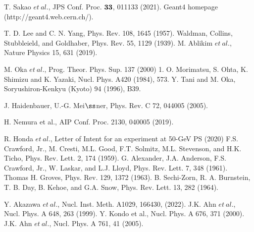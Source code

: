 \begin{thebibliography}{99}
 T. Sakao $et\ al.$, JPS Conf. Proc. $\bf{33}$, 011133 (2021).
Geant4 homepage (http://geant4.web.cern.ch/).



T. D. Lee and C. N. Yang, Phys. Rev. 108, 1645 (1957).
Waldman, Collins, Stubbleield, and Goldhaber, Phys. Rev. 55, 1129 (1939).
M. Ablikim $et\ al.$, Nature Physics 15, 631 (2019).





M. Oka $et\ al.$, Prog. Theor. Phys. Sup. 137 (2000) 1.
O. Morimatsu, S. Ohta, K. Shimizu and K. Yazaki, Nucl. Phys. A420 (1984), 573.
Y. Tani and M. Oka, Soryushiron-Kenkyu (Kyoto) 94 (1996), B39.






J. Haidenbauer, U.-G. Mei$\ss$ner, Phys. Rev. C 72, 044005 (2005).

H. Nemura et al., AIP Conf. Proc. 2130, 040005 (2019).




R. Honda $et\ al.$, Letter of Intent for an experiment at 50-GeV PS (2020)
F.S. Crawford, Jr., M. Cresti, M.L. Good, F.T. Solmitz, M.L. Stevenson, and H.K. Ticho, Phys. Rev. Lett. 2, 174 (1959).
G. Alexander, J.A. Anderson, F.S. Crawford, Jr., W. Laskar, and L.J. Lloyd, Phys. Rev. Lett. 7, 348 (1961).
Thomas H. Groves, Phys. Rev. 129, 1372 (1963).
B. Sechi-Zorn, R. A. Burnstein, T. B. Day, B. Kehoe, and G.A. Snow, Phys. Rev. Lett. 13, 282 (1964).



Y. Akazawa $et\ al.$, Nucl. Inst. Meth. A1029, 166430, (2022).
J.K. Ahn $et\ al.$, Nucl. Phys. A 648, 263 (1999).
Y. Kondo et al., Nucl. Phys. A 676, 371 (2000).
J.K. Ahn $et\ al.$, Nucl. Phys. A 761, 41 (2005).



\end{thebibliography}
